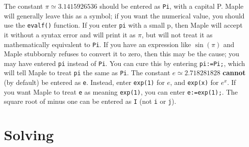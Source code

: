\documentclass{amsart}
\begin{document}
\begin{itemize}
%
  The constant $\pi\simeq 3.1415926536$ should be entered as
  \verb~Pi~, with a capital P.  Maple will generally leave this as a
  symbol; if you want the numerical value, you should use the
  \verb~evalf()~ function. 
%
  If you enter \verb~pi~ with a small p, then Maple will accept it
  without a syntax error and will print it as $\pi$, but will not
  treat it as mathematically equivalent to \verb~Pi~.  If you have an
  expression like $\sin(\pi)$ and Maple stubbornly refuses to convert
  it to zero, then this may be the cause; you may have entered
  \verb~pi~ instead of \verb~Pi~.  You can cure this by entering
  \verb~pi:=Pi;~, which will tell Maple to treat \verb~pi~ the same
  as \verb~Pi~. 
%
  The constant $e\simeq 2.718281828$ \textbf{cannot} (by default)
  be entered as \verb~e~.  Instead, enter \verb~exp(1)~ for $e$, and
  \verb~exp(x)~ for $e^x$.  If you want Maple to treat \verb~e~ as
  meaning \verb~exp(1)~, you can enter \verb~e:=exp(1);~. 
%
  The square root of minus one can be
  entered as \verb~I~ (not \verb~i~ or \verb~j~).  
\end{itemize}

\section{Solving}
\setcounter{notecounter}{0}
\end{document}
